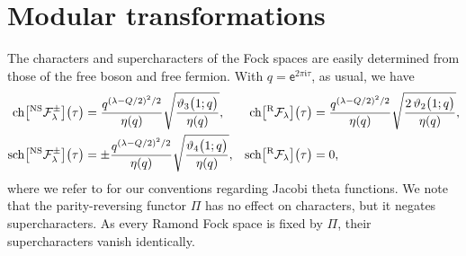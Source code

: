 \documentclass[a4paper,reqno,12pt]{report}
\theoremstyle{definition}
\numberwithin{equation}{section}
\let\originalleft\left     %
\let\originalright\right
\renewcommand{\left}{\mathopen{}\mathclose\bgroup\originalleft}
\renewcommand{\right}{\aftergroup\egroup\originalright}
\newcommand{\func}[2]{#1 \left( #2 \right)} %
\newcommand{\brac}[1]{\left( #1 \right)}
\newcommand{\ii}{\mathfrak{i}} %
\newcommand{\ee}{\mathsf{e}}   %
\newcommand{\Fock}[1]{\mathcal{F}_{#1}}      %
\newcommand{\chmap}{\mathrm{ch}}
\newcommand{\schmap}{\mathrm{sch}}
\newcommand{\Gr}[1]{\bigl[ #1 \bigr]}            %
\newcommand{\ch}[1]{\chmap \Gr{#1}}              %
\newcommand{\fch}[2]{\ch{#1} \bigl( #2 \bigr)}   %
\newcommand{\sch}[1]{\schmap \Gr{#1}}              %
\newcommand{\fsch}[2]{\sch{#1} \bigl( #2 \bigr)}   %
\newcommand{\jth}[1]{\vartheta_{#1}}             %
\newcommand{\fjth}[2]{\jth{#1} \bigl( #2 \bigr)} %
\theoremstyle{plain}
\newcommand{\NSFock}[1]{{}^{\text{NS}}\Fock{#1}}   %
\newcommand{\RFock}[1]{{}^{\text{R}}\Fock{#1}}     %
\begin{document}
\section{Modular transformations} \label{sec:Mod}

The characters and supercharacters of the Fock spaces are easily determined from those of the free boson and free fermion.  With $q = \ee^{2 \pi \ii \tau}$, as usual, we have
\begin{equation} \label{ch:Fock}
\begin{aligned}
\fch{\NSFock{\lambda}^{\pm}}{\tau} &= %
\frac{q^{\brac{\lambda - Q/2}^2 / 2}}{\func{\eta}{q}} \sqrt{\frac{\fjth{3}{1;q}}{\func{\eta}{q}}}, &
%
\fch{\RFock{\lambda}}{\tau} &= %
\frac{q^{\brac{\lambda - Q/2}^2 / 2}}{\func{\eta}{q}} \sqrt{\frac{2\,\fjth{2}{1;q}}{\func{\eta}{q}}}, \\
\fsch{\NSFock{\lambda}^{\pm}}{\tau} &= %
\pm \frac{q^{\brac{\lambda - Q/2}^2 / 2}}{\func{\eta}{q}} \sqrt{\frac{\fjth{4}{1;q}}{\func{\eta}{q}}}, &
%
\fsch{\RFock{\lambda}}{\tau} &= 0,
\end{aligned}
\end{equation}
where we refer to \cite[App.~B]{RidSL208} for our conventions regarding Jacobi theta functions.  We note that the parity-reversing functor $\Pi$ has no effect on characters, but it negates supercharacters.  As every Ramond Fock space is fixed by $\Pi$, their supercharacters vanish identically.
\end{document}
